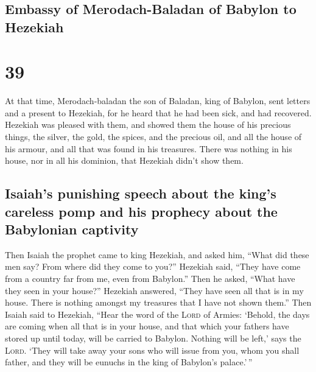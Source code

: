 \hypertarget{embassy-of-merodach-baladan-of-babylon-to-hezekiah}{%
\subsection{Embassy of Merodach-Baladan of Babylon to
Hezekiah}\label{embassy-of-merodach-baladan-of-babylon-to-hezekiah}}

\hypertarget{section-38}{%
\section{39}\label{section-38}}

 At that time, Merodach-baladan the son of Baladan, king
of Babylon, sent letters and a present to Hezekiah, for he heard that he
had been sick, and had recovered.  Hezekiah was pleased
with them, and showed them the house of his precious things, the silver,
the gold, the spices, and the precious oil, and all the house of his
armour, and all that was found in his treasures. There was nothing in
his house, nor in all his dominion, that Hezekiah didn't show them.

\hypertarget{isaiahs-punishing-speech-about-the-kings-careless-pomp-and-his-prophecy-about-the-babylonian-captivity}{%
\subsection{Isaiah's punishing speech about the king's careless pomp and
his prophecy about the Babylonian
captivity}\label{isaiahs-punishing-speech-about-the-kings-careless-pomp-and-his-prophecy-about-the-babylonian-captivity}}

 Then Isaiah the prophet came to king Hezekiah, and asked
him, ``What did these men say? From where did they come to you?''
Hezekiah said, ``They have come from a country far from me, even from
Babylon.''  Then he asked, ``What have they seen in your
house?'' Hezekiah answered, ``They have seen all that is in my house.
There is nothing amongst my treasures that I have not shown them.''
 Then Isaiah said to Hezekiah, ``Hear the word of the
\textsc{Lord} of Armies:  `Behold, the days are coming
when all that is in your house, and that which your fathers have stored
up until today, will be carried to Babylon. Nothing will be left,' says
the \textsc{Lord}.  `They will take away your sons who
will issue from you, whom you shall father, and they will be eunuchs in
the king of Babylon's palace.'\,''

